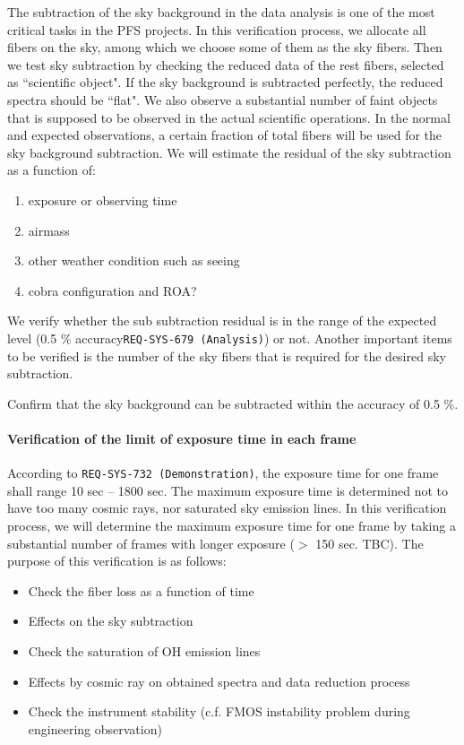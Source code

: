 The subtraction of the sky background in the data analysis is one of the most critical tasks in the PFS projects. 
In this verification process, we allocate all fibers on the sky, among which we choose some of them as the sky fibers.
Then we test sky subtraction by checking the reduced data of the rest fibers, selected as ``scientific object".
If the sky background is subtracted perfectly, the reduced spectra should be ``flat". 
We also observe a substantial number of faint objects that is supposed to be observed in the actual scientific operations. In the normal and expected observations, a certain fraction of total fibers will be used for the sky background subtraction. We will estimate the residual of the sky subtraction as a function of:
\begin{enumerate}
\item{exposure or observing time}
\item{airmass}
\item{other weather condition such as seeing}
\item{cobra configuration and ROA?}
\end{enumerate}

We verify whether the sub subtraction residual is in the range of the expected level (0.5 \% accuracy{\tt REQ-SYS-679 (Analysis)}) or not. 
Another important items to be verified is the number of the sky fibers that is required for the desired sky subtraction.

\begin{itembox}[l]{}
Confirm that the sky background can be subtracted within the accuracy of 0.5 \%.
\end{itembox}

\paragraph{Verification of the limit of exposure time in each frame}

According to {\tt REQ-SYS-732 (Demonstration)}, the exposure time for one frame shall range 10 sec -- 1800 sec. 
The maximum exposure time is determined not to have too many cosmic rays, nor saturated sky emission lines.
In this verification process, we will determine the maximum exposure time for one frame by taking a substantial number of frames with longer exposure ($>$ 150 sec. TBC). 
The purpose of this verification is as follows:

\begin{itemize}
\item{Check the fiber loss as a function of time}
\item{Effects on the sky subtraction}
\item{Check the saturation of OH emission lines}
\item{Effects by cosmic ray on obtained spectra and data reduction process}
\item{Check the instrument stability (c.f. FMOS instability problem during engineering observation)}
\end{itemize}

